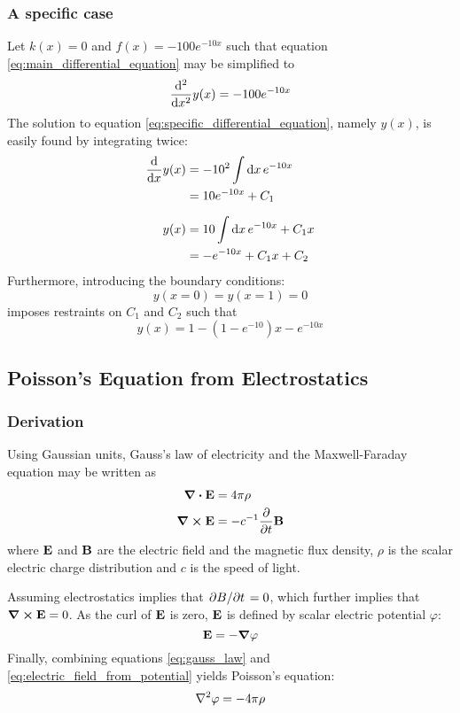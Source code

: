 \documentclass[reprint,english]{revtex4-1}
\begin{document}
\subsubsection{A specific case}\label{sec:specific_case}
Let \(k(x)=0\) and \(f(x)=-100e^{-10x}\) such that equation \ref{eq:main_differential_equation} may be simplified to
\begin{equation}\label{eq:specific_differential_equation}
\dv[2]{x}y(x)=-100e^{-10x}
\end{equation}
The solution to equation \eqref{eq:specific_differential_equation}, namely \(y(x)\), is easily found by integrating twice:
\begin{align}
\dv{x}y(x)&=-10^2\int\dd{x}e^{-10x}\nonumber\\
&=10e^{-10x}+C_1\nonumber\\[2mm]
y(x)&=10\int\dd{x}e^{-10x}+C_1x\nonumber\\
&=-e^{-10x}+C_1x+C_2\label{eq:general_solution_to_specific}
\end{align}
Furthermore, introducing the boundary conditions:
\[y(x=0)=y(x=1)=0\]
imposes restraints on \(C_1\) and \(C_2\) such that
\begin{equation}\label{eq:specific_solution_to_specific}
y(x)=1-(1-e^{-10})x-e^{-10x}
\end{equation}
\subsection{Poisson's Equation from Electrostatics}\label{sec:poisson_equation}
\subsubsection{Derivation}
Using Gaussian units, Gauss's law of electricity and the Maxwell-Faraday equation may be written as
\begin{align}
\div\vb{E}&=4\pi\rho\label{eq:gauss_law}\\
\curl\vb{E}&=-c^{-1}\pdv{t}\vb{B}\label{eq:maxwell-farady_equation}
\end{align}
where \(\vb{E}\) and \(\vb{B}\) are the electric field and the magnetic flux density, \(\rho\) is the scalar electric charge distribution and \(c\) is the speed of light.

Assuming electrostatics implies that \(\pdv*{B}{t}=0\), which further implies that \(\curl\vb{E}=0\). As the curl of \(\vb{E}\) is zero, \(\vb{E}\) is defined by scalar electric potential \(\varphi\):
\begin{equation}\label{eq:electric_field_from_potential}
\vb{E}=-\grad\varphi
\end{equation}
Finally, combining equations \eqref{eq:gauss_law} and \eqref{eq:electric_field_from_potential} yields Poisson's equation:
\begin{equation}\label{eq:poisson_equation_electrostatics}
\laplacian\varphi=-4\pi\rho
\end{equation}
\newpage
\end{document}
